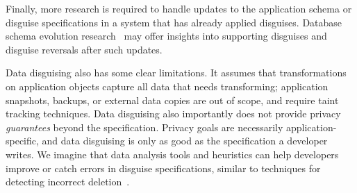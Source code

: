 %
Finally, more research is required to handle updates to the application schema or
disguise specifications in a system that has already applied disguises.
%
Database schema evolution research~\cite{schema:evo} may offer insights
into supporting disguises and disguise reversals after such updates.
%

%
Data disguising also has some clear limitations.
%
It assumes that transformations on application objects capture all data that needs
transforming; application snapshots, backups, or external data copies are out of scope,
and require \eg taint tracking techniques.
%
Data disguising also importantly does not provide privacy \emph{guarantees} beyond the
specification.
%
Privacy goals are necessarily application-specific, and data disguising is only as good
as the specification a developer writes.
%
We imagine that data analysis tools and heuristics can help developers improve or catch
errors in disguise specifications, similar to \eg techniques for detecting incorrect
deletion~\cite{delf}.
%
%




\iffalse
